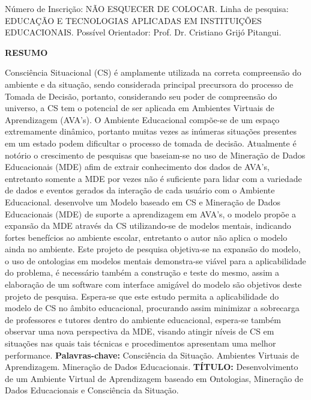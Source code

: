 \documentclass[
	oneside,
	12pt,				%
	a4paper,			%
	english,			%
	brazil,				%
	article
	]{abntex2}
\renewcommand{\imprimircapa}{%
	\begin{capa}%
		\center	
		{\ABNTEXchapterfont\imprimirinstituicao}
		\vfill
		\begin{center}
			\ABNTEXchapterfont\bfseries\imprimirtitulo
		\end{center}
		\vspace*{3cm}
		\begin{flushright}
		Número de Inscrição: NÃO ESQUECER DE COLOCAR.
		\linebreak
		Linha de pesquisa: EDUCAÇÃO E TECNOLOGIAS APLICADAS EM INSTITUIÇÕES EDUCACIONAIS.
		\linebreak
		Possível Orientador: Prof. Dr. Cristiano Grijó Pitangui.
		\end{flushright}
		\vfill
		\imprimirlocal 
		\linebreak		
		\imprimirdata
		\vspace*{1cm}
	\end{capa}
}
\begin{document}
 

\frenchspacing 

\imprimircapa

\textual

\OnehalfSpacing %
\begin{center}
	\ABNTEXchapterfont\bfseries RESUMO
\end{center}

Consciência Situacional (CS) é amplamente utilizada na correta compreensão do ambiente e da situação, sendo considerada principal precursora do processo de Tomada de Decisão, portanto, considerando seu poder de compreensão do universo, a CS tem o potencial de ser aplicada em Ambientes Virtuais de Aprendizagem (AVA’s).
O Ambiente Educacional compõe-se de um espaço extremamente dinâmico, portanto muitas vezes as inúmeras situações presentes em um estado podem dificultar o processo de tomada de decisão. Atualmente é notório o crescimento de pesquisas que baseiam-se no uso de Mineração de Dados Educacionais (MDE) afim de extrair conhecimento dos dados de AVA's, entretanto somente a MDE por vezes não é suficiente para lidar com a variedade de dados e eventos gerados da interação de cada usuário com o Ambiente Educacional.  desenvolve um Modelo baseado em CS e Mineração de Dados Educacionais (MDE) de suporte a aprendizagem em AVA's, o modelo propõe a expansão da MDE através da CS utilizando-se de modelos mentais, indicando fortes benefícios ao ambiente escolar, entretanto o autor não aplica o modelo ainda no ambiente. Este projeto de pesquisa objetiva-se na expansão do modelo, o uso de ontologias em modelos mentais demonstra-se viável para a aplicabilidade do problema, é necessário também a construção e teste do mesmo, assim a elaboração de um software com interface amigável do modelo são objetivos deste projeto de pesquisa. Espera-se que este estudo permita a aplicabilidade do modelo de CS no âmbito educacional, procurando assim minimizar a sobrecarga de professores e tutores dentro do ambiente educacional, espera-se também observar uma nova perspectiva da MDE, visando atingir níveis de CS em situações nas quais tais técnicas e procedimentos apresentam uma melhor performance. 
\linebreak\linebreak
\textbf{Palavras-chave:} Consciência da Situação. Ambientes Virtuais de Aprendizagem. Mineração de Dados Educacionais. 
\linebreak\linebreak
\textbf{TÍTULO:} Desenvolvimento de um Ambiente Virtual de Aprendizagem baseado em Ontologias, Mineração de Dados Educacionais e Consciência da Situação.
\end{document}
